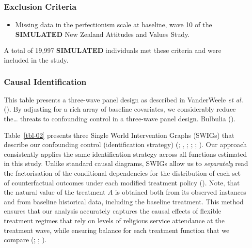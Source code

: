 \documentclass[
  single column]{article}
\providecommand{\tightlist}{%
  \setlength{\itemsep}{0pt}\setlength{\parskip}{0pt}}\usepackage{longtable,booktabs,array}
\begin{document}
\subsubsection{Exclusion Criteria}\label{exclusion-criteria}

\begin{itemize}
\tightlist
\item
  Missing data in the perfectionism scale at baseline, wave 10 of the
  \textbf{SIMULATED} New Zealand Attitudes and Values Study.
\end{itemize}

A total of 19,997 \textbf{SIMULATED} individuals met these criteria and
were included in the study.

\subsubsection{Causal Identification}\label{causal-identification}

\begin{table}

\caption{\label{tbl-02}This table presents a three-wave panel design as
described in VanderWeele \emph{et al.}
(). By adjusting for a rich array of
baseline covariates, we considerably reduce the\ldots{} threats to
confounding control in a three-wave panel design. Bulbulia
().}

\centering{

\examplelongitudinal

}

\end{table}%

Table~\ref{tbl-02} presents three Single World Intervention Graphs
(SWIGs) that describe our confounding control (identification strategy)
(;
,
;
;
;
). Our
approach consistently applies the same identification strategy across
all functions estimated in this study. Unlike standard causal diagrams,
SWIGs allow us to \emph{separately} read the factorisation of the
conditional dependencies for the distribution of each set of
counterfactual outcomes under each modified treatment policy
().
Note, that the natural value of the treatment \(A\) is obtained both
from its observed instances and from baseline historical data, including
the baseline treatment. This method ensures that our analysis accurately
captures the causal effects of flexible treatment regimes that rely on
levels of religious service attendance at the treatment wave, while
ensuring balance for each treatment function that we compare
(;
;
).
\end{document}
